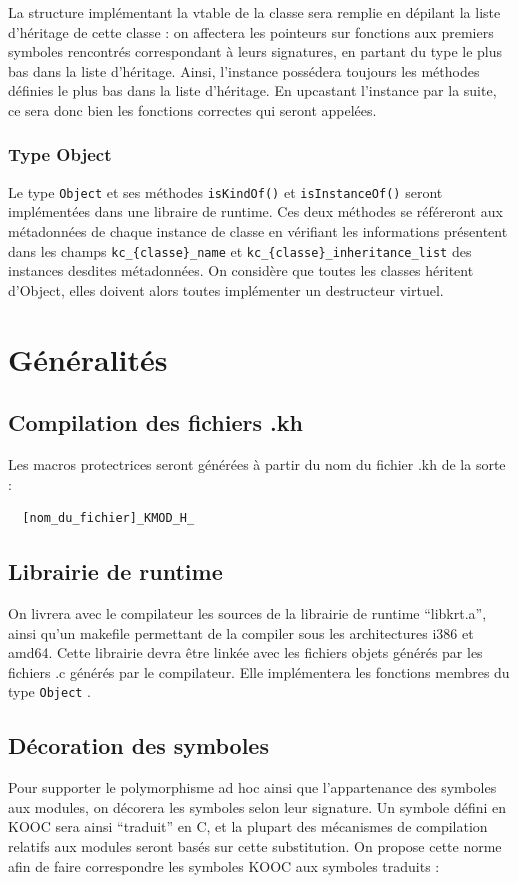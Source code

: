 \documentclass[12pt,a4paper]{article}
\def\code#1{\texttt{#1}}
\begin{document}
\begin{NoHyper}
La structure implémentant la vtable de la classe sera remplie en dépilant la liste d'héritage de cette classe : on affectera les pointeurs sur fonctions aux premiers symboles rencontrés correspondant à leurs signatures, en partant du type le plus bas dans la liste d'héritage. Ainsi, l'instance possédera toujours les méthodes définies le plus bas dans la liste d'héritage. En upcastant l'instance par la suite, ce sera donc bien les fonctions correctes qui seront appelées.

\subsubsection{Type Object}
Le type \code{Object} et ses méthodes \code{isKindOf()} et \code{isInstanceOf()} seront implémentées dans une libraire de runtime. Ces deux méthodes se référeront aux métadonnées de chaque instance de classe en vérifiant les informations présentent dans les champs \code{kc\_\{classe\}\_name} et \code{kc\_\{classe\}\_inheritance\_list} des instances desdites métadonnées. On considère que toutes les classes héritent d'Object, elles doivent alors toutes implémenter un destructeur virtuel.

\section{Généralités}
\subsection{Compilation des fichiers .kh}
Les macros protectrices seront générées à partir du nom du fichier .kh de la sorte :
\begin{verbatim}
  [nom_du_fichier]_KMOD_H_
\end{verbatim}  
\subsection{Librairie de runtime}
On livrera avec le compilateur les sources de la librairie de runtime ``libkrt.a'', ainsi qu'un makefile permettant de la compiler sous les architectures i386 et amd64. Cette librairie devra être linkée avec les fichiers objets générés par les fichiers .c générés par le compilateur. Elle implémentera les fonctions membres du type \code{Object}
.
\subsection{Décoration des symboles}
Pour supporter le polymorphisme ad hoc ainsi que l'appartenance des symboles aux modules, on décorera les symboles selon leur signature. Un symbole défini en KOOC sera ainsi ``traduit'' en C, et la plupart des mécanismes de compilation relatifs aux modules seront basés sur cette substitution. On propose cette norme afin de faire correspondre les symboles KOOC aux symboles traduits :


\end{NoHyper}
\end{document}
